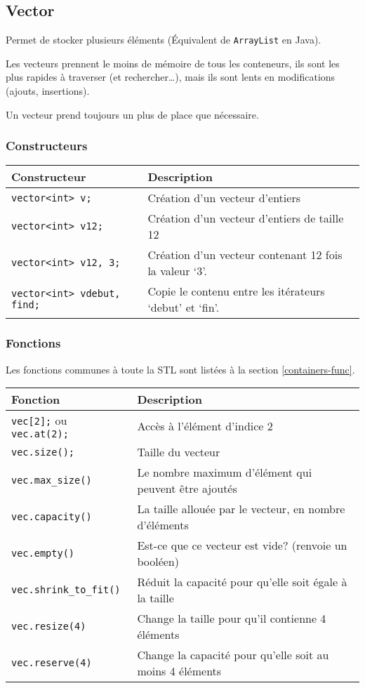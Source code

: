 \documentclass[10pt,a4paper,french]{article}
\begin{document}
\subsection{Vector}\label{vector}

Permet de stocker plusieurs éléments (Équivalent de \texttt{ArrayList} en Java).

Les vecteurs prennent le moins de mémoire de tous les conteneurs, ils sont les plus rapides à traverser (et rechercher\dots), mais ils sont lents en modifications (ajouts, insertions).

Un vecteur prend toujours un plus de place que nécessaire.

\subsubsection{Constructeurs}

\begin{tabular}{l|l}
Constructeur & Description \\
\hline
\texttt{vector<int> v;} & Création d'un vecteur d'entiers \\
\texttt{vector<int> v{12};} & Création d'un vecteur d'entiers de taille 12 \\
\texttt{vector<int> v{12, 3};} & Création d'un vecteur contenant 12 fois la valeur `3'. \\
\texttt{vector<int> v{debut, find};} & Copie le contenu entre les itérateurs `debut' et `fin'. \\
\end{tabular}

\subsubsection{Fonctions}
Les fonctions communes à toute la STL sont listées à la section \cref{containers-func}.

\begin{tabular}{l|l}
Fonction & Description \\
\hline
\texttt{vec[2];} ou \texttt{vec.at(2);} & Accès à l'élément d'indice 2 \\
\texttt{vec.size();} & Taille du vecteur \\
\texttt{vec.max_size()} & Le nombre maximum d'élément qui peuvent être ajoutés \\
\texttt{vec.capacity()} & La taille allouée par le vecteur, en nombre d'éléments \\
\texttt{vec.empty()} & Est-ce que ce vecteur est vide? (renvoie un booléen) \\
\texttt{vec.shrink_to_fit()} & Réduit la capacité pour qu'elle soit égale à la taille \\
\texttt{vec.resize(4)} & Change la taille pour qu'il contienne 4 éléments \\
\texttt{vec.reserve(4)} & Change la capacité pour qu'elle soit au moins 4 éléments \\
\end{tabular}
\end{document}
